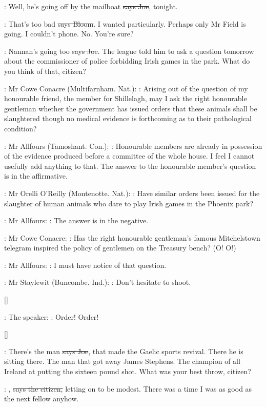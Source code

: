 \joe:
Well, he's going off by the mailboat
\sout{says Joe}, tonight.

\Bloom:
That's too bad \sout{says Bloom}.
I wanted particularly. Perhaps only Mr Field
is going. I couldn't phone. No. You're sure?

\joe:
Nannan's going too \sout{says Joe}.
The league told him to ask a question
tomorrow about the commissioner of police forbidding Irish games in the
park. What do you think of that, citizen?

:
Mr Cowe Conacre (Multifarnham. Nat.):
\conacre:
Arising out of the question of my
honourable friend, the member for Shillelagh, may I ask the right
honourable gentleman whether the government has issued orders that these
animals shall be slaughtered though no medical evidence is forthcoming as
to their pathological condition?

:
Mr Allfours (Tamoshant. Con.):
\allfours:
Honourable members are already in
possession of the evidence produced before a committee of the whole house.
I feel I cannot usefully add anything to that. The answer to the
honourable member's question is in the affirmative.

:
Mr Orelli O'Reilly (Montenotte. Nat.): 
\oreilly:
Have similar orders been issued for
the slaughter of human animals who dare to play Irish games in the
Phoenix park?

:
Mr Allfours: 
\allfours:
The answer is in the negative.

:
Mr Cowe Conacre: 
\conacre:
Has the right honourable gentleman's famous
Mitchelstown telegram inspired the policy of gentlemen on the Treasury
bench? (O! O!)

:
Mr Allfours: 
\allfours:
I must have notice of that question.

:
Mr Staylewit (Buncombe. Ind.): 
\staylewit:
Don't hesitate to shoot.

[]

:
The speaker:
\Speaker:
Order! Order!

[]

\joe:
There's the man \sout{says Joe},
that made the Gaelic sports revival. There he
is sitting there. The man that got away James Stephens. The champion of
all Ireland at putting the sixteen pound shot. What was your best throw,
citizen?

\citizen:
, \sout{says the citizen,}
letting on to be modest. There was a time
I was as good as the next fellow anyhow.


